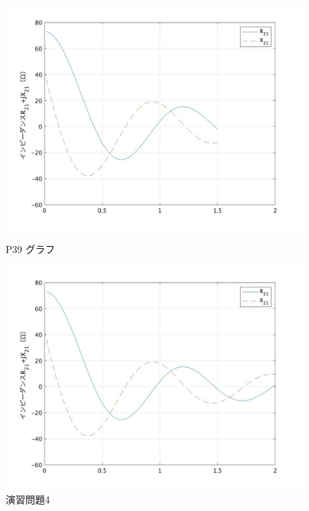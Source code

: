 \documentclass[dvipdfmx,autodetect-engine,titlepage]{jsarticle}
\begin{document}
   \begin{figure}[h]
    \centering
    \begin{minipage}[b]{0.45\linewidth}
    \begin{center}
      \includegraphics[keepaspectratio,scale=0.2]{pic1.jpg}
      \end{center}
      \caption{P39 グラフ}
    \end{minipage}
    \begin{minipage}[b]{0.45\linewidth}
    \begin{center}
      \includegraphics[keepaspectratio,scale=0.2]{pic2.jpg}
      \end{center}
      \caption{演習問題4}
    \end{minipage}
  \end{figure}
\end{document}
